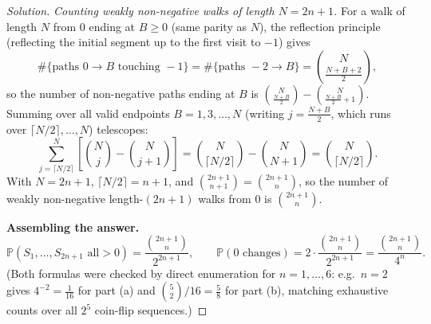 \documentclass[11pt]{article}
\theoremstyle{definition}
\begin{document}
\begin{proof}[Solution]
\emph{Counting weakly non-negative walks of length $N=2n+1$.} For a walk of length $N$ from $0$ ending at $B\ge0$ (same parity as $N$), the reflection principle (reflecting the initial segment up to the first visit to $-1$) gives
\[
\#\{\text{paths }0\to B\text{ touching }-1\}=\#\{\text{paths }-2\to B\}=\binom{N}{\frac{N+B+2}{2}},
\]
so the number of non-negative paths ending at $B$ is $\binom{N}{\frac{N+B}2}-\binom{N}{\frac{N+B}2+1}$. Summing over all valid endpoints $B=1,3,\dots,N$ (writing $j=\frac{N+B}2$, which runs over $\lceil N/2\rceil,\dots,N$) telescopes:
\[
\sum_{j=\lceil N/2\rceil}^{N}\left[\binom Nj-\binom N{j+1}\right]=\binom{N}{\lceil N/2\rceil}-\binom{N}{N+1}=\binom{N}{\lceil N/2\rceil}.
\]
With $N=2n+1$, $\lceil N/2\rceil=n+1$, and $\binom{2n+1}{n+1}=\binom{2n+1}{n}$, so the number of weakly non-negative length-$(2n+1)$ walks from $0$ is $\binom{2n+1}{n}$.

\textbf{Assembling the answer.}
\[
\mathbb P(S_1,\dots,S_{2n+1}\text{ all}>0)=\frac{\binom{2n+1}{n}}{2^{2n+1}},\qquad
\mathbb P(0\text{ changes})=2\cdot\frac{\binom{2n+1}{n}}{2^{2n+1}}=\boxed{\dfrac{\binom{2n+1}{n}}{4^n}}.
\]
(Both formulas were checked by direct enumeration for $n=1,\dots,6$: e.g.\ $n=2$ gives $4^{-2}=\tfrac1{16}$ for part (a) and $\binom52/16=\tfrac5{8}$ for part (b), matching exhaustive counts over all $2^5$ coin-flip sequences.)
\end{proof}
\end{document}

